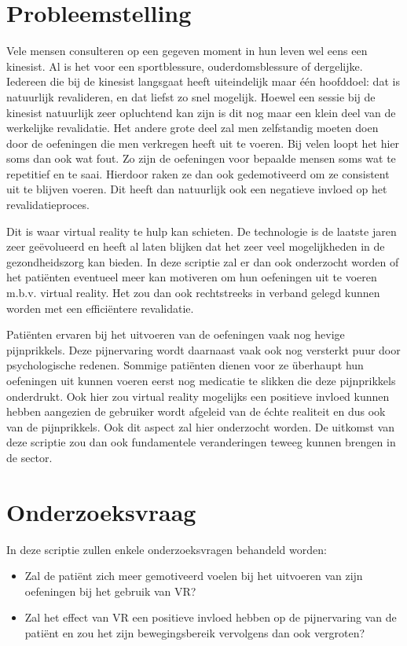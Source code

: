 \section{Probleemstelling}
\label{sec:probleemstelling}
Vele mensen consulteren op een gegeven moment in hun leven wel eens een kinesist. Al is het voor een sportblessure, ouderdomsblessure of dergelijke. Iedereen die bij de kinesist langsgaat heeft uiteindelijk maar één hoofddoel: dat is natuurlijk revalideren, en dat liefst zo snel mogelijk. Hoewel een sessie bij de kinesist natuurlijk zeer opluchtend kan zijn is dit nog maar een klein deel van de werkelijke revalidatie. Het andere grote deel zal men zelfstandig moeten doen door de oefeningen die men verkregen heeft uit te voeren. Bij velen loopt het hier soms dan ook wat fout. Zo zijn de oefeningen voor bepaalde mensen soms wat te repetitief en te saai. Hierdoor raken ze dan ook gedemotiveerd om ze consistent uit te blijven voeren. Dit heeft dan natuurlijk ook een negatieve invloed op het revalidatieproces. 

Dit is waar virtual reality te hulp kan schieten. De technologie is de laatste jaren zeer geëvolueerd en heeft al laten blijken dat het zeer veel mogelijkheden in de gezondheidszorg kan bieden. In deze scriptie zal er dan ook onderzocht worden of het patiënten eventueel meer kan motiveren om hun oefeningen uit te voeren m.b.v. virtual reality. Het zou dan ook rechtstreeks in verband gelegd kunnen worden met een efficiëntere revalidatie.

Patiënten ervaren bij het uitvoeren van de oefeningen vaak nog hevige pijnprikkels. Deze pijnervaring wordt daarnaast vaak ook nog versterkt puur door psychologische redenen. Sommige patiënten dienen voor ze überhaupt hun oefeningen uit kunnen voeren eerst nog medicatie te slikken die deze pijnprikkels onderdrukt. Ook hier zou virtual reality mogelijks een positieve invloed kunnen hebben aangezien de gebruiker wordt afgeleid van de échte realiteit en dus ook van de pijnprikkels. Ook dit aspect zal hier onderzocht worden. De uitkomst van deze scriptie zou dan ook fundamentele veranderingen teweeg kunnen brengen in de sector.


\section{Onderzoeksvraag}
\label{sec:onderzoeksvraag}

In deze scriptie zullen enkele onderzoeksvragen behandeld worden:
\begin{itemize}
	\item Zal de patiënt zich meer gemotiveerd voelen bij het uitvoeren van zijn oefeningen bij het gebruik van VR?
	\newline
	\item Zal het effect van VR een positieve invloed hebben op de pijnervaring van de patiënt en zou het zijn bewegingsbereik vervolgens dan ook vergroten?
\end{itemize}


